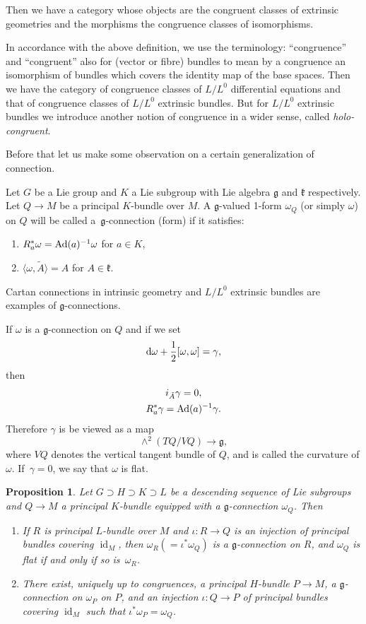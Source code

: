 \documentclass[10pt,a4paper]{amsart}
\newcommand{\g}{\mathfrak g}
\newcommand{\id}{\operatorname{id}}
\newtheorem{prop}[thm]{Proposition}
\numberwithin{equation}{section}
\begin{document}
Then we have a category whose objects are the congruent classes of extrinsic geometries and the morphisms the congruence classes of isomorphisms.

In accordance with the above definition, we use the terminology: ``cong\-ruence'' and ``cong\-ruent'' also for (vector or fibre) bundles to mean by a congruence an isomorphism of bundles which covers the identity map of the base spaces. Then we have the category of congruence classes of $L/L^0$ differential equations and that of congruence classes of $L/L^0$ extrinsic bundles. But for $L/L^0$ extrinsic bundles we introduce another notion of congruence in a wider sense, called \emph{holo-congruent}.


Before that let us make some observation on a certain generalization of connection.

Let $G$ be a Lie group and $K$ a Lie subgroup with Lie algebra $\g$ and $\mathfrak k$ respectively. Let $Q \to M$ be a principal $K$-bundle over $M$. A $\g$-valued 1-form $\omega_Q$ (or simply $\omega$) on $Q$ will be called a~$\g$-con\-nection (form) if it satisfies:
\begin{enumerate}\itemsep=0pt
	\item[$(i)$] $R_a^* \omega = {\rm Ad}(a)^{-1} \omega$ for $a \in K$,
	\item[$(ii)$] $\langle \omega, \tilde A \rangle = A$ for $A \in \mathfrak k$.
\end{enumerate}

Cartan connections in intrinsic geometry and $L/L^0$ extrinsic bundles are examples of $\g$-connections.

If $\omega$ is a $\g$-connection on $Q$ and if we set
\[
{\rm d}\omega + \frac12 [\omega, \omega] = \gamma,
\]
then
\begin{gather*}
	i_{\tilde A}\gamma = 0, \\
	R_a^* \gamma = {\rm Ad}(a)^{-1} \gamma.
\end{gather*}
Therefore $\gamma$ is be viewed as a map
\[
\wedge ^2 ( TQ/VQ) \to \g ,
\]
where $VQ$ denotes the vertical tangent bundle of $Q$, and is called the curvature of $\omega$. If~$\gamma = 0$, we say that $\omega$ is flat.

\begin{prop}
	Let $ G \supset H \supset K \supset L$ be a descending sequence of Lie subgroups and $Q \to M$ a principal $K$-bundle equipped with a $\g$-connection $\omega_Q$. Then
\begin{enumerate}\itemsep=0pt
\item[$(1)$] If $R$ is principal $L$-bundle over $M$ and $\iota\colon R \to Q$ is an injection of principal bundles cove\-ring $\id_M$, then $ \omega_R( = \iota^*\omega_Q)$ is a $\g$-connection on $R$, and $\omega_Q$ is flat if and only if so is~$\omega_R$.
	
\item[$(2)$] There exist, uniquely up to congruences, a principal $H$-bundle $P \to M$, a $\g$-connection on $\omega_P$ on $P$, and an injection $\iota\colon Q \to P$ of principal bundles covering $\id_M$ such that $\iota^* \omega_P = \omega_Q$.
\end{enumerate}
\end{prop}
\end{document}
